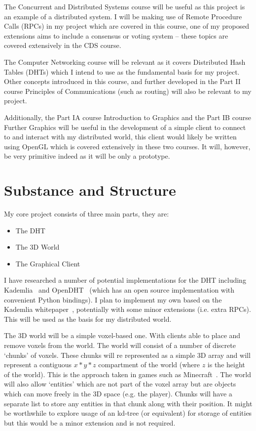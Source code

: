 \documentclass[12pt,a4paper]{article}
\begin{document}
	The Concurrent and Distributed Systems course will be useful as this project is an example of a distributed system. I will be making use of Remote Procedure Calls (RPCs) in my project which are covered in this course, one of my proposed extensions aims to include a consensus or voting system -- these topics are covered extensively in the CDS course.
	
	The Computer Networking course will be relevant as it covers Distributed Hash Tables (DHTs) which I intend to use as the fundamental basis for my project. Other concepts introduced in this course, and further developed in the Part II course Principles of Communications (such as routing) will also be relevant to my project.
	
	Additionally, the Part IA course Introduction to Graphics and the Part IB course Further Graphics will be useful in the development of a simple client to connect to and interact with my distributed world, this client would likely be written using OpenGL which is covered extensively in these two courses. It will, however, be very primitive indeed as it will be only a prototype.
	
	\section{Substance and Structure}
	
	My core project consists of three main parts, they are:
	\begin{itemize}
		\item The DHT
		\item The 3D World
		\item The Graphical Client
	\end{itemize}
	I have researched a number of potential implementations for the DHT including Kademlia~\cite{kademlia} and OpenDHT~\cite{odht} (which has an open source implementation with convenient Python bindings). I plan to implement my own based on the Kademlia whitepaper~\cite{kademlia}, potentially with some minor extensions (i.e. extra RPCs). This will be used as the basis for my distributed world.
	
	The 3D world will be a simple voxel-based one. With clients able to place and remove voxels from the world. The world will consist of a number of discrete `chunks' of voxels. These chunks will re represented as a simple 3D array and will represent a contiguous $x*y*z$ compartment of the world (where $z$ is the height of the world). This is the approach taken in games such as Minecraft~\cite{mc}. The world will also allow `entities' which are not part of the voxel array but are objects which can move freely in the 3D space (e.g. the player). Chunks will have a separate list to store any entities in that chunk along with their position. It might be worthwhile to explore usage of an kd-tree (or equivalent) for storage of entities but this would be a minor extension and is not required.
	
\end{document}

